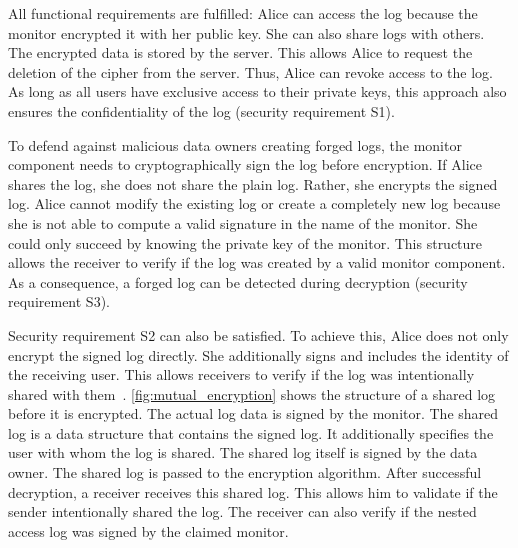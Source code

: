 \documentclass[../main.tex]{subfiles}
\begin{document}
All functional requirements are fulfilled:
Alice can access the log because the monitor encrypted it with her public key.
She can also share logs with others.
The encrypted data is stored by the server.
This allows Alice to request the deletion of the cipher from the server.
Thus, Alice can revoke access to the log.
As long as all users have exclusive access to their private keys, this approach also ensures the confidentiality of the log (security requirement S1).

To defend against malicious data owners creating forged logs, the monitor component needs to cryptographically sign the log before encryption.
If Alice shares the log, she does not share the plain log.
Rather, she encrypts the signed log.
Alice cannot modify the existing log or create a completely new log because she is not able to compute a valid signature in the name of the monitor.
She could only succeed by knowing the private key of the monitor.
This structure allows the receiver to verify if the log was created by a valid monitor component.
As a consequence, a forged log can be detected during decryption (security requirement S3).

Security requirement S2 can also be satisfied.
To achieve this, Alice does not only encrypt the signed log directly.
She additionally signs and includes the identity of the receiving user.
This allows receivers to verify if the log was intentionally shared with them~\cite{Davis2001}.
\cref{fig:mutual_encryption} shows the structure of a shared log before it is encrypted.
The actual log data is signed by the monitor.
The shared log is a data structure that contains the signed log.
It additionally specifies the user with whom the log is shared.
The shared log itself is signed by the data owner.
The shared log is passed to the encryption algorithm.
After successful decryption, a receiver receives this shared log.
This allows him to validate if the sender intentionally shared the log.
The receiver can also verify if the nested access log was signed by the claimed monitor.
\end{document}
